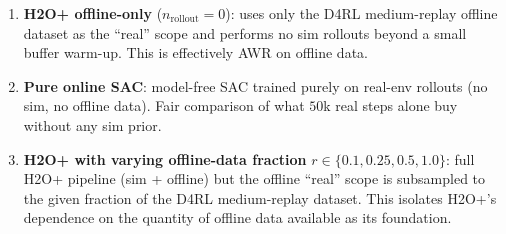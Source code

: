 \documentclass{article}
\theoremstyle{definition}
\begin{document}
\begin{enumerate}
  \item \textbf{H2O+ offline-only} ($n_{\text{rollout}}=0$): uses only
    the D4RL medium-replay offline dataset as the ``real'' scope and
    performs no sim rollouts beyond a small buffer warm-up.  This is
    effectively AWR on offline data.
  \item \textbf{Pure online SAC}: model-free SAC trained purely on
    real-env rollouts (no sim, no offline data).  Fair comparison of
    what $50$k real steps alone buy without any sim prior.
  \item \textbf{H2O+ with varying offline-data fraction}
    $r \in \{0.1, 0.25, 0.5, 1.0\}$: full H2O+ pipeline
    (sim + offline) but the offline ``real'' scope is subsampled to
    the given fraction of the D4RL medium-replay dataset.  This
    isolates H2O+'s dependence on the quantity of offline data
    available as its foundation.
\end{enumerate}
\end{document}
